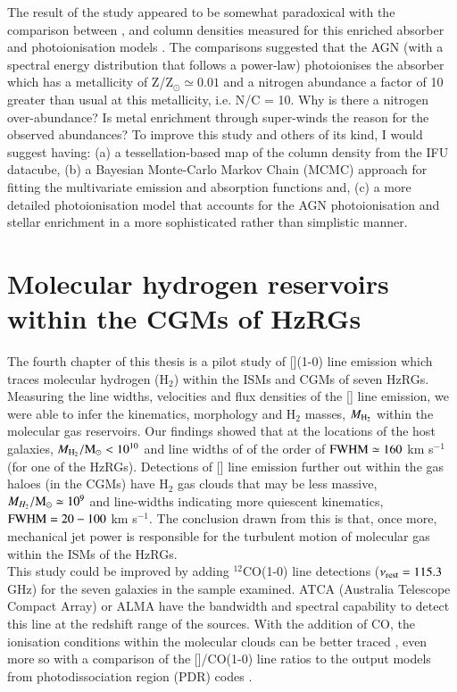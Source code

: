 The result of the study appeared to be somewhat paradoxical with the comparison between ,  and  column densities measured for this enriched absorber and  photoionisation models \citep{Ferland2013}. The comparisons suggested that the AGN (with a spectral energy distribution that follows a power-law) photoionises the absorber which has a metallicity of Z/Z$_\odot \simeq 0.01$ and a nitrogen abundance a factor of 10 greater than usual at this metallicity, i.e. N/C = 10. Why is there a nitrogen over-abundance? Is metal enrichment through super-winds the reason for the observed abundances? To improve this study and others of its kind, I would suggest having: (a) a tessellation-based map of the  column density from the IFU datacube, (b) a Bayesian Monte-Carlo Markov Chain (MCMC) approach for fitting the multivariate emission and absorption functions and, (c) a more detailed photoionisation model that accounts for the AGN photoionisation and stellar enrichment in a more sophisticated rather than simplistic manner. \\

\section{Molecular hydrogen reservoirs within the CGMs of HzRGs}

The fourth chapter of this thesis is a pilot study of [](1-0) line emission which traces molecular hydrogen (H$_2$) within the ISMs and CGMs of seven HzRGs. Measuring the line widths, velocities and flux densities of the [] line emission, we were able to infer the kinematics, morphology and H$_2$ masses, $M_{\rm H_2}$ within the molecular gas reservoirs. Our findings showed that at the locations of the host galaxies, $M_{\rm H_2}/\rm{M}_\odot < 10^{10}$ and line widths of of the order of $\rm FWHM \simeq 160$ km s$^{-1}$ (for one of the HzRGs). Detections of [] line emission further out within the gas haloes (in the CGMs) have H$_2$ gas clouds that may be less massive, $M_{H_2}/\rm{M}_\odot \simeq 10^9$ and line-widths indicating more quiescent kinematics, $\rm FWHM=20 - 100$ km s$^{-1}.$ The conclusion drawn from this is that, once more, mechanical jet power is responsible for the turbulent motion of molecular gas within the ISMs of the HzRGs. \\

This study could be improved by adding $^{12}$CO(1-0) line detections ($\nu_{\rm rest} =115.3$ GHz) for the seven galaxies in the sample examined. ATCA (Australia Telescope Compact Array) or ALMA have the bandwidth and spectral capability to detect this line at the redshift range of the sources. With the addition of CO, the ionisation conditions within the molecular clouds can be better traced \citep{Gullberg2016b,emonts2018,Papadopoulos2018}, even more so with a comparison of the []/CO(1-0) line ratios to the output models from photodissociation region (PDR) codes \citep{Bothwell2017}. 